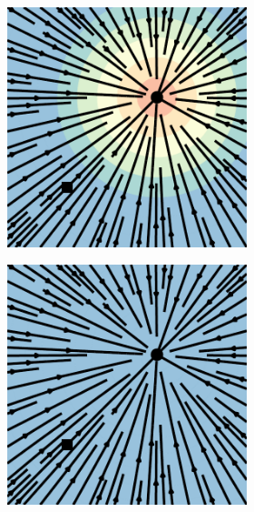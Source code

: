 \documentclass{article}
\begin{document}
\begin{figure}
\begin{subfigure}[t]{0.43\linewidth}
\begin{subfigure}[t]{0.23\linewidth}
        \vspace{-1.5em}
        \caption*{}
    \end{subfigure}
    \begin{subfigure}[t]{0.23\linewidth}
        \centering
        \includegraphics[width=\linewidth]{figures/plots/2d_vf_flow_match_ot_2.pdf}
        \vspace{-1.5em}
        \caption*{}
    \end{subfigure}
    \begin{subfigure}[t]{0.23\linewidth}
        \centering
        \includegraphics[width=\linewidth]{figures/plots/2d_vf_flow_match_ot_3.pdf}

\end{subfigure}
\end{subfigure}
\end{figure}
\end{document}
